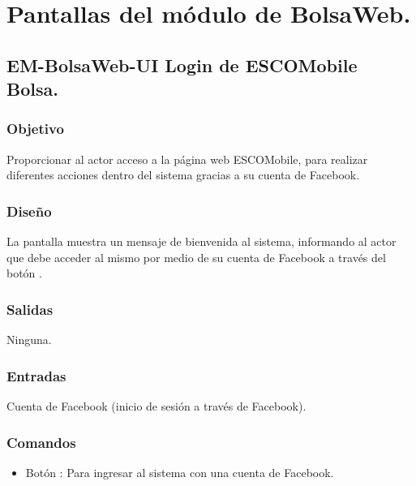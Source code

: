 


\section{Pantallas del módulo de BolsaWeb.}

\subsection{EM-BolsaWeb-UI Login de ESCOMobile Bolsa.}

\subsubsection{Objetivo}
	\noindent
	Proporcionar al actor acceso a la página web ESCOMobile, para realizar diferentes acciones dentro del sistema gracias a su cuenta de Facebook.

\subsubsection{Diseño}
	\noindent
	La pantalla muestra un mensaje de bienvenida al sistema, informando al actor que debe acceder al mismo por medio de su cuenta de Facebook a través del botón .

\pagebreak	
{}

\subsubsection{Salidas}
	\noindent
	Ninguna.

\subsubsection{Entradas}
	\noindent
	Cuenta de Facebook (inicio de sesión a través de Facebook).

\subsubsection{Comandos}
	\begin{itemize}
		\item Botón : Para ingresar al sistema con una cuenta de Facebook.
	\end{itemize}


